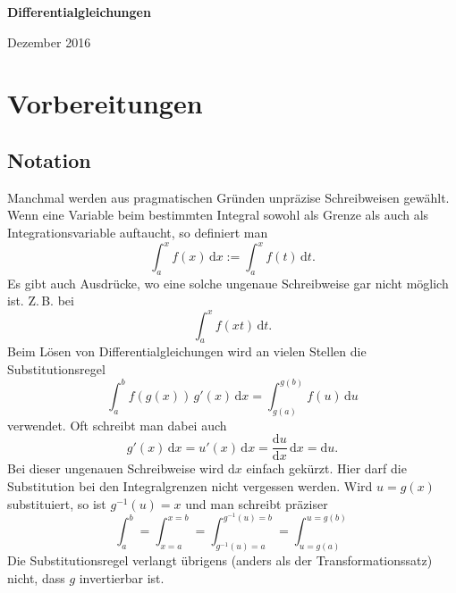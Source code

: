 \documentclass[a4paper,10pt,fleqn,twocolumn,twoside,openany]{article}
\numberwithin{equation}{section}
\theoremstyle{definition}
\begin{document}
\setlength{\abovedisplayskip}{6pt}
\setlength{\belowdisplayskip}{6pt}
\setlength{\abovedisplayshortskip}{6pt}
\setlength{\belowdisplayshortskip}{6pt}

\begin{titlepage}
\centering
\phantom{x}

\vspace{20em}
{\noindent\Huge\sffamily\textbf{Differentialgleichungen}}

\vspace{2em}
{\Large Dezember 2016}\\
\end{titlepage}

\thispagestyle{empty}

\renewcommand{\contentsname}{
\normalfont\sffamily\bfseries\LARGE
Inhaltsverzeichnis}
\tableofcontents

\section{Vorbereitungen}
\subsection{Notation}
Manchmal werden aus pragmatischen Gründen unpräzise Schreibweisen
gewählt. Wenn eine Variable beim bestimmten Integral sowohl als Grenze
als auch als Integrationsvariable auftaucht, so definiert man
\begin{equation}
\int_a^x f(x)\,\mathrm dx := \int_a^x f(t)\,\mathrm dt.
\end{equation}
Es gibt auch Ausdrücke, wo eine solche ungenaue Schreibweise gar nicht
möglich ist. Z.\,B. bei
\begin{equation}
\int_a^x f(xt)\,\mathrm dt.
\end{equation}
Beim Lösen von Differentialgleichungen
wird an vielen Stellen die Substitutionsregel
\begin{equation}
\int_a^b f(g(x))\,g'(x)\,\mathrm dx
= \int_{g(a)}^{g(b)} f(u)\,\mathrm du
\end{equation}
verwendet. Oft schreibt man dabei auch
\begin{equation}
g'(x)\,\mathrm dx = u'(x)\,\mathrm dx
= \frac{\mathrm du}{\mathrm dx}\,\mathrm dx
= \mathrm du.
\end{equation}
Bei dieser ungenauen Schreibweise wird $\mathrm dx$ einfach
{\glqq}gekürzt{\grqq}. Hier darf die Substitution bei den
Integralgrenzen nicht vergessen werden. Wird $u=g(x)$ substituiert,
so ist $g^{-1}(u)=x$ und man schreibt präziser
\begin{equation}
\int_a^b = \int_{x=a}^{x=b} = \int_{g^{-1}(u)=a}^{g^{-1}(u)=b}
= \int_{u=g(a)}^{u=g(b)}
\end{equation}
Die Substitutionsregel verlangt übrigens (anders als der
Transformationssatz) nicht, dass $g$ invertierbar ist.
\end{document}
